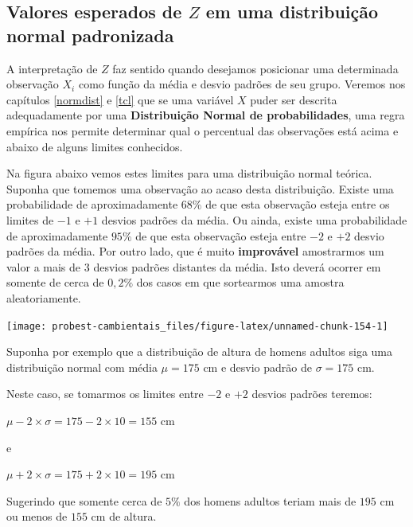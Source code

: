 \documentclass[
]{book}
\begin{document}
\hypertarget{valores-esperados-de-z-em-uma-distribuiuxe7uxe3o-normal-padronizada}{%
\subsection{\texorpdfstring{Valores esperados de \(Z\) em uma distribuição normal padronizada}{Valores esperados de Z em uma distribuição normal padronizada}}\label{valores-esperados-de-z-em-uma-distribuiuxe7uxe3o-normal-padronizada}}

A interpretação de \(Z\) faz sentido quando desejamos posicionar uma determinada observação \(X_i\) como função da média e desvio padrões de seu grupo. Veremos nos capítulos \ref{normdist} e \ref{tcl} que se uma variável \(X\) puder ser descrita adequadamente por uma \textbf{Distribuição Normal de probabilidades}, uma regra empírica nos permite determinar qual o percentual das observações está acima e abaixo de alguns limites conhecidos.

Na figura abaixo vemos estes limites para uma distribuição normal teórica. Suponha que tomemos uma observação ao acaso desta distribuição. Existe uma probabilidade de aproximadamente \(68\%\) de que esta observação esteja entre os limites de \(-1\) e \(+1\) desvios padrões da média. Ou ainda, existe uma probabilidade de aproximadamente \(95\%\) de que esta observação esteja entre \(-2\) e \(+2\) desvio padrões da média. Por outro lado, que é muito \textbf{improvável} amostrarmos um valor a mais de \(3\) desvios padrões distantes da média. Isto deverá ocorrer em somente de cerca de \(0,2\%\) dos casos em que sortearmos uma amostra aleatoriamente.

\begin{center}\texttt{[image: probest-cambientais\_files/figure-latex/unnamed-chunk-154-1]} \end{center}

Suponha por exemplo que a distribuição de altura de homens adultos siga uma distribuição normal com média \(\mu = 175\) cm e desvio padrão de \(\sigma = 175\) cm.

Neste caso, se tomarmos os limites entre \(-2\) e \(+2\) desvios padrões teremos:

\(\mu - 2 \times \sigma = 175 - 2 \times 10 = 155\) cm

e

\(\mu + 2 \times \sigma = 175 + 2 \times 10 = 195\) cm

Sugerindo que somente cerca de \(5\%\) dos homens adultos teriam mais de \(195\) cm ou menos de \(155\) cm de altura.
\end{document}

